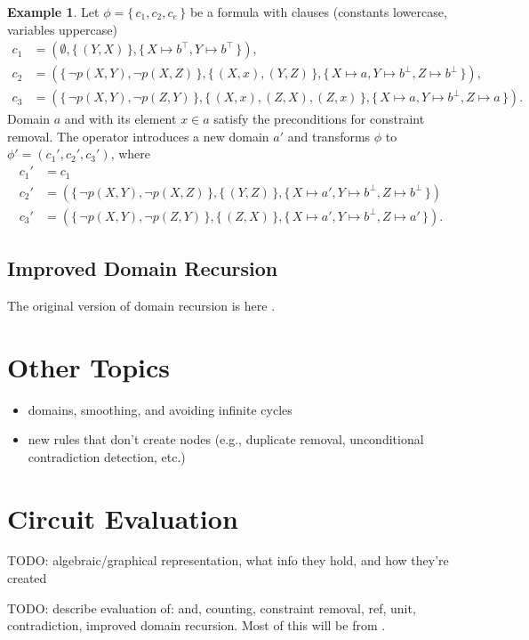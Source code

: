 \documentclass{article}
\theoremstyle{definition}
\newtheorem{example}{Example}
\begin{document}
\begin{example}
  Let $\phi = \{\, c_1, c_2, c_e \,\}$ be a formula with clauses (constants lowercase, variables uppercase)
  \begin{align*}
    c_1 &= (\emptyset, \{\, (Y, X) \,\}, \{\, X \mapsto b^\top, Y \mapsto b^\top \,\}), \\
    c_2 &= (\{\, \neg p(X, Y), \neg p(X, Z) \,\}, \{\, (X, x), (Y, Z) \,\}, \{\, X \mapsto a, Y \mapsto b^\bot, Z \mapsto b^\bot \,\}), \\
    c_3 &= (\{\, \neg p(X, Y), \neg p(Z, Y) \,\}, \{\, (X, x), (Z, X), (Z, x) \,\}, \{\, X \mapsto a, Y \mapsto b^\bot, Z \mapsto a \,\}).
  \end{align*}
  Domain $a$ and with its element $x \in a$ satisfy the preconditions for constraint removal. The operator introduces a new domain $a'$ and transforms $\phi$ to $\phi' = (c_1', c_2', c_3')$, where
  \begin{align*}
    c_1' &= c_1 \\
    c_2' &= (\{\, \neg p(X, Y), \neg p(X, Z) \,\}, \{\, (Y, Z) \,\}, \{\, X \mapsto a', Y \mapsto b^\bot, Z \mapsto b^\bot \,\}) \\
    c_3' &= (\{\, \neg p(X, Y), \neg p(Z, Y) \,\}, \{\, (Z, X) \,\}, \{\, X \mapsto a', Y \mapsto b^\bot, Z \mapsto a' \,\}).
  \end{align*}
\end{example}

\subsection{Improved Domain Recursion}

The original version of domain recursion is here \cite{DBLP:conf/nips/Broeck11}.

\section{Other Topics}

\begin{itemize}
\item domains, smoothing, and avoiding infinite cycles
\item new rules that don't create nodes (e.g., duplicate removal, unconditional contradiction detection, etc.)
\end{itemize}

\section{Circuit Evaluation}

TODO: algebraic/graphical representation, what info they hold, and how they're created

TODO: describe evaluation of: and, counting, constraint removal, ref, unit, contradiction, improved domain recursion. Most of this will be from \cite{DBLP:conf/ijcai/BroeckTMDR11}.



\end{document}
